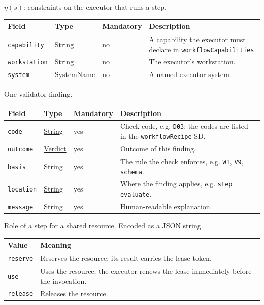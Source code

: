 \documentclass[a4paper]{arrowhead}
\newcommand{\mref}[1]{{\textcolor{ArrowheadPurple}{\hyperref[sec:model:#1]{#1}}}}
\newcommand{\pref}[1]{{\textcolor{ArrowheadGrey}{\hyperref[sec:model:primitives:#1]{#1}}}}
\begin{document}
$\eta(s)$: constraints on the executor that runs a step.

{\small
\begin{longtable}{|p{3.7cm}|p{4.2cm}|p{1.6cm}|p{6.3cm}|}

\hline
\rowcolor{gray!33} Field & Type & Mandatory & Description \\ \hline
\endhead
\texttt{capability} & \pref{String} & no & A capability the executor must declare in \texttt{workflow\allowbreak{}Capabilities}. \\ \hline
\texttt{workstation} & \pref{String} & no & The executor's workstation. \\ \hline
\texttt{system} & \pref{SystemName} & no & A named executor system. \\ \hline
\end{longtable}
}

One validator finding.

{\small
\begin{longtable}{|p{3.7cm}|p{4.2cm}|p{1.6cm}|p{6.3cm}|}

\hline
\rowcolor{gray!33} Field & Type & Mandatory & Description \\ \hline
\endhead
\texttt{code} & \pref{String} & yes & Check code, e.g. \texttt{D03}; the codes are listed in the \texttt{workflow\allowbreak{}Recipe} SD. \\ \hline
\texttt{outcome} & \mref{Verdict} & yes & Outcome of this finding. \\ \hline
\texttt{basis} & \pref{String} & yes & The rule the check enforces, e.g. \texttt{W1}, \texttt{V9}, \texttt{schema}. \\ \hline
\texttt{location} & \pref{String} & yes & Where the finding applies, e.g. \texttt{step evaluate}. \\ \hline
\texttt{message} & \pref{String} & yes & Human-readable explanation. \\ \hline
\end{longtable}
}

Role of a step for a shared resource.
 Encoded as a JSON string.
{\small
\begin{longtable}{|p{3.9cm}|p{11.9cm}|}

\hline
\rowcolor{gray!33} Value & Meaning \\ \hline
\endhead
\texttt{reserve} & Reserves the resource; its result carries the lease token. \\ \hline
\texttt{use} & Uses the resource; the executor renews the lease immediately before the invocation. \\ \hline
\texttt{release} & Releases the resource. \\ \hline
\end{longtable}
}
\end{document}
